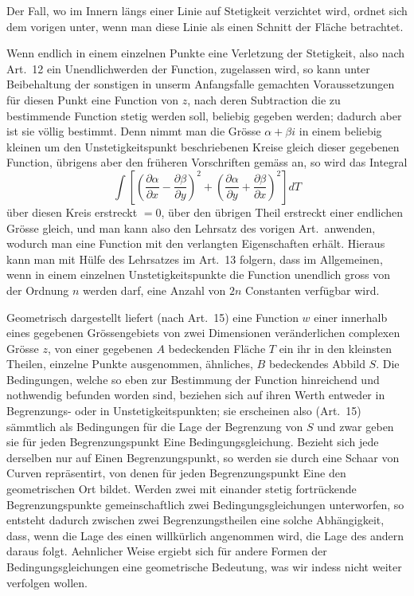 \documentclass[12pt,a4paper]{article}
\begin{document}
Der Fall, wo im Innern längs einer Linie auf Stetigkeit verzichtet wird, ordnet sich dem vorigen unter, wenn man diese Linie als einen Schnitt der Fläche betrachtet.

Wenn endlich in einem einzelnen Punkte eine Verletzung der Stetigkeit, also nach Art.~12 ein Unendlichwerden der Function, zugelassen wird, so kann unter Beibehaltung der sonstigen in unserm Anfangsfalle gemachten Voraussetzungen für diesen Punkt eine Function von $z$, nach deren Subtraction die zu bestimmende Function stetig werden soll, beliebig gegeben werden; dadurch aber ist sie völlig bestimmt. Denn nimmt man die Grösse $\alpha + \beta i$ in einem beliebig kleinen um den Unstetigkeitspunkt beschriebenen Kreise gleich dieser gegebenen Function, übrigens aber den früheren Vorschriften gemäss an, so wird das Integral
\[
\int \left[\left(\frac{\partial \alpha}{\partial x} - \frac{\partial \beta}{\partial y}\right)^2 + \left(\frac{\partial \alpha}{\partial y} + \frac{\partial \beta}{\partial x}\right)^2\right] dT
\]
über diesen Kreis erstreckt ${}= 0$, über den übrigen Theil erstreckt einer endlichen Grösse gleich, und man kann also den Lehrsatz des vorigen Art.\ anwenden, wodurch man eine Function mit den verlangten Eigenschaften erhält. Hieraus kann man mit Hülfe des Lehrsatzes im Art.~13 folgern, dass im Allgemeinen, wenn in einem einzelnen Unstetigkeitspunkte die Function unendlich gross von der Ordnung $n$ werden darf, eine Anzahl von $2n$ Constanten verfügbar wird.

Geometrisch dargestellt liefert (nach Art.~15) eine Function $w$ einer innerhalb eines gegebenen Grössengebiets von zwei Dimensionen veränderlichen complexen Grösse $z$, von einer gegebenen $A$ bedeckenden Fläche $T$ ein ihr in den kleinsten Theilen, einzelne Punkte ausgenommen, ähnliches, $B$ bedeckendes Abbild $S$. Die Bedingungen, welche so eben zur Bestimmung der Function hinreichend und nothwendig befunden worden sind, beziehen sich auf ihren Werth entweder in Begrenzungs- oder in Unstetigkeitspunkten; sie erscheinen also (Art.~15) sämmtlich als Bedingungen für die Lage der Begrenzung von $S$ und zwar geben sie für jeden Begrenzungspunkt Eine Bedingungsgleichung. Bezieht sich jede derselben nur auf Einen Begrenzungspunkt, so werden sie durch eine Schaar von Curven repräsentirt, von denen für jeden Begrenzungspunkt Eine den geometrischen Ort bildet. Werden zwei mit einander stetig fortrückende Begrenzungspunkte gemeinschaftlich zwei Bedingungsgleichungen unterworfen, so entsteht dadurch zwischen zwei Begrenzungstheilen eine solche Abhängigkeit, dass, wenn die Lage des einen willkürlich angenommen wird, die Lage des andern daraus folgt. Aehnlicher Weise ergiebt sich für andere Formen der Bedingungsgleichungen eine geometrische Bedeutung, was wir indess nicht weiter verfolgen wollen.
\end{document}

